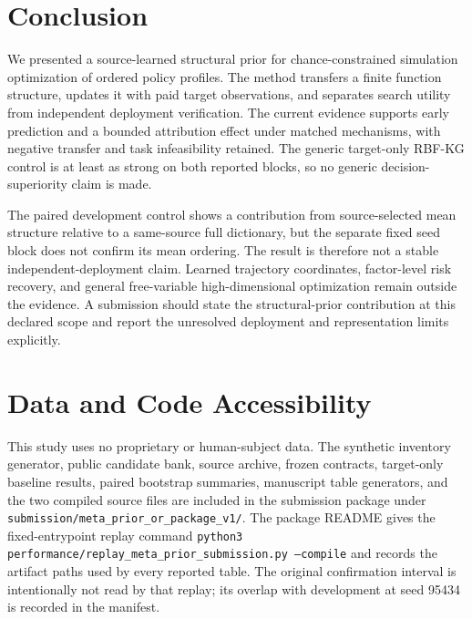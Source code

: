 \section{Conclusion}\label{sec:mp_conclusion}

We presented a source-learned structural prior for chance-constrained
simulation optimization of ordered policy profiles.  The method transfers a
finite function structure, updates it with paid target observations, and
separates search utility from independent deployment verification.  The
current evidence supports early prediction and a bounded attribution effect
under matched mechanisms, with negative transfer and task infeasibility
retained.  The generic target-only RBF-KG control is at least as strong on both
reported blocks, so no generic decision-superiority claim is made.

The paired development control shows a contribution from source-selected mean
structure relative to a same-source full dictionary, but the separate fixed
seed block does not confirm its mean ordering.  The result is therefore not a
stable independent-deployment claim.  Learned trajectory coordinates,
factor-level risk recovery, and general free-variable high-dimensional
optimization remain outside the evidence.  A submission should state the
structural-prior contribution at this declared scope and report the unresolved
deployment and representation limits explicitly.

\section{Data and Code Accessibility}\label{sec:mp_data_code}

This study uses no proprietary or human-subject data.  The synthetic inventory
generator, public candidate bank, source archive, frozen contracts, target-only
baseline results, paired bootstrap summaries, manuscript table generators, and
the two compiled source files are included in the submission package under
\texttt{submission/meta\_prior\_or\_package\_v1/}.  The package README gives the
fixed-entrypoint replay command
\texttt{python3 performance/replay\_meta\_prior\_submission.py --compile}
and records the artifact paths used by every reported table.  The original
confirmation interval is intentionally not read by that replay; its overlap
with development at seed 95434 is recorded in the manifest.
